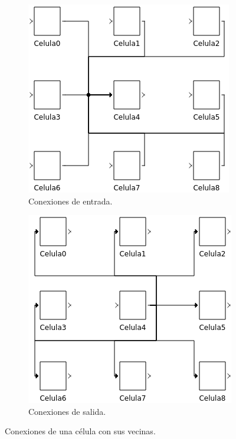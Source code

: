 \documentclass[12pt]{article}
\begin{document}
\begin{figure}[ht]
  \centering
  \begin{subfigure}[b]{0.45\textwidth}
    \includegraphics[width=\textwidth]{imagenes/entrada}
    \caption{Conexiones de entrada.}\label{img:coneciones_entrada}
  \end{subfigure}
  \hfill
  \begin{subfigure}[b]{0.45\textwidth}
    \includegraphics[width=\textwidth]{imagenes/salida}
    \caption{Conexiones de salida.}\label{img:coneciones_salida}
  \end{subfigure}
  \caption{Conexiones de una célula con sus vecinas.}\label{img:conexiones}
\end{figure}
\end{document}
